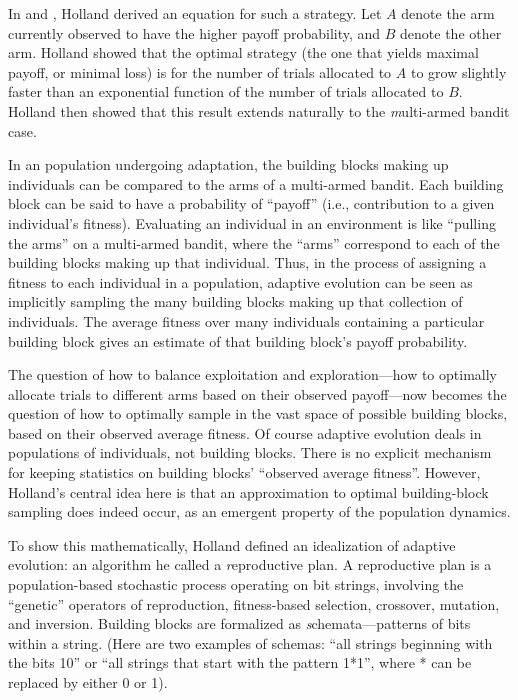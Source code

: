 \documentclass{sig-alternate}
\begin{document}
In \cite{OptimalAllocationOfTrials} and \cite{ANAS}, Holland derived
an equation for such a strategy.  Let $A$ denote the arm currently
observed to have the higher payoff probability, and $B$ denote the
other arm.  Holland showed that the optimal strategy (the one that
yields maximal payoff, or minimal loss) is for the number of trials
allocated to $A$ to grow slightly faster than an exponential function
of the number of trials allocated to $B$.  Holland then showed that this
result extends naturally to the {\emph multi-armed bandit} case.

In an population undergoing adaptation, the building blocks making up
individuals can be compared to the arms of a multi-armed bandit.  Each
building block can be said to have a probability of ``payoff'' (i.e.,
contribution to a given individual's fitness).  Evaluating an
individual in an environment is like ``pulling the arms'' on a
multi-armed bandit, where the ``arms'' correspond to each of the
building blocks making up that individual.  Thus, in the process of
assigning a fitness to each individual in a population, adaptive
evolution can be seen as implicitly sampling the many building blocks
making up that collection of individuals.  The average fitness over
many individuals containing a particular building block gives an
estimate of that building block's payoff probability.

The question of how to balance exploitation and exploration---how to
optimally allocate trials to different arms based on their observed
payoff---now becomes the question of how to optimally sample in the
vast space of possible building blocks, based on their observed
average fitness.  Of course adaptive evolution deals in populations of
individuals, not building blocks.  There is no explicit mechanism for
keeping statistics on building blocks' ``observed average fitness''.
However, Holland's central idea here is that an approximation to
optimal building-block sampling does indeed occur, as an emergent
property of the population dynamics.

To show this mathematically, Holland defined an idealization of
adaptive evolution: an algorithm he called a {\emph reproductive
  plan}.  A reproductive plan is a population-based stochastic process
operating on bit strings, involving the ``genetic'' operators of
reproduction, fitness-based selection, crossover, mutation, and
inversion.  Building blocks are formalized as {\emph
  schemata}---patterns of bits within a string. (Here are two examples
of schemas: ``all strings beginning with the bits 10'' or ``all
strings that start with the pattern 1*1'', where * can be replaced by
either 0 or 1).
\end{document}
